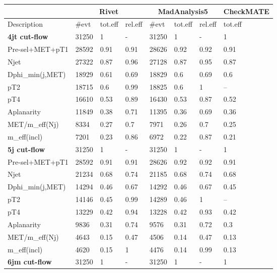 \documentclass[11pt]{cernrep}
\begin{document}
\begin{table}
\begin{tabular}{ | l || l | l | l || l | l | l || l | }
\hline
    &  \multicolumn{3}{c||}{\bf Rivet} & \multicolumn{3}{c||}{\bf MadAnalysis5} &   {\bf CheckMATE}   \\ \hline
  Description       & \#evt & tot.eff & rel.eff & \#evt & tot.eff & rel.eff &   tot.eff   \\ \hline \hline
\hline
{\bf 4jt cut-flow} & 31250 & 1 & - & 31250 & 1 & - & 1  \\ \hline
Pre-sel+MET+pT1   & 28592 & 0.91 & 0.91 & 28626 & 0.92 & 0.92 & 0.91  \\ \hline
Njet              & 27322 & 0.87 & 0.96 & 27128 & 0.87 & 0.95 & 0.87  \\ \hline
Dphi\_min(j,MET)   & 18929 & 0.61 & 0.69 & 18829 & 0.6 & 0.69 & 0.6  \\ \hline
pT2               & 18715 & 0.6 & 0.99 & 18825 & 0.6 & 1 &     --       \\ \hline
pT4               & 16610 & 0.53 & 0.89 & 16430 & 0.53 & 0.87 & 0.52  \\ \hline
Aplanarity        & 11849 & 0.38 & 0.71 & 11395 & 0.36 & 0.69 & 0.36  \\ \hline
MET/m\_eff(Nj)     & 8334 & 0.27 & 0.7 & 7971 & 0.26 & 0.7 & 0.25  \\ \hline
m\_eff(incl)       & 7201 & 0.23 & 0.86 & 6972 & 0.22 & 0.87 & 0.21  \\ \hline
\hline
{\bf 5j cut-flow} & 31250 & 1 & - & 31250 & 1 & - & 1 \\ \hline
Pre-sel+MET+pT1   & 28592 & 0.91 & 0.91 & 28626 & 0.92 & 0.92 & 0.91 \\ \hline
Njet              & 21234 & 0.68 & 0.74 & 21185 & 0.68 & 0.74 & 0.68 \\ \hline
Dphi\_min(j,MET)   & 14294 & 0.46 & 0.67 & 14292 & 0.46 & 0.67 & 0.45 \\ \hline
pT2               & 14146 & 0.45 & 0.99 & 14289 & 0.46 & 1 &    --       \\ \hline
pT4               & 13229 & 0.42 & 0.94 & 13228 & 0.42 & 0.93 & 0.42 \\ \hline
Aplanarity        & 9836 & 0.31 & 0.74 & 9576 & 0.31 & 0.72 & 0.3 \\ \hline
MET/m\_eff(Nj)     & 4643 & 0.15 & 0.47 & 4506 & 0.14 & 0.47 & 0.13 \\ \hline
m\_eff(incl)       & 4620 & 0.15 & 1 & 4476 & 0.14 & 0.99 & 0.13 \\ \hline
\hline
{\bf 6jm cut-flow} & 31250 & 1 & - & 31250 & 1 & - & 1  \\ \hline

\end{tabular}
\end{table}
\end{document}
